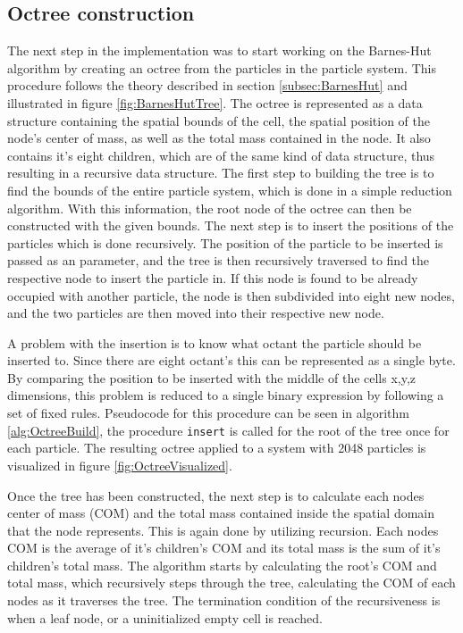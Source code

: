 \subsection{Octree construction} \label{subsec:OctreeConstruction}
The next step in the implementation was to start working on the Barnes-Hut algorithm by creating an octree from the particles in the particle system. This procedure follows the theory described in section \ref{subsec:BarnesHut} and illustrated in figure \ref{fig:BarnesHutTree}. The octree is represented as a data structure containing the spatial bounds of the cell, the spatial position of the node's center of mass, as well as the total mass contained in the node. It also contains it's eight children, which are of the same kind of data structure, thus resulting in a recursive data structure. The first step to building the tree is to find the bounds of the entire particle system, which is done in a simple reduction algorithm. With this information, the root node of the octree can then be constructed with the given bounds. The next step is to insert the positions of the particles which is done recursively. The position of the particle to be inserted is passed as an parameter, and the tree is then recursively traversed to find the respective node to insert the particle in. If this node is found to be already occupied with another particle, the node is then subdivided into eight new nodes, and the two particles are then moved into their respective new node. 

A problem with the insertion is to know what octant the particle should be inserted to. Since there are eight octant's this can be represented as a single byte. By comparing the position to be inserted with the middle of the cells x,y,z dimensions, this problem is reduced to a single binary expression by following a set of fixed rules. Pseudocode for this procedure can be seen in algorithm \ref{alg:OctreeBuild}, the procedure \lstinline{insert} is called for the root of the tree once for each particle. The resulting octree applied to a system with 2048 particles is visualized in figure \ref{fig:OctreeVisualized}.

Once the tree has been constructed, the next step is to calculate each nodes center of mass (COM) and the total mass contained inside the spatial domain that the node represents. This is again done by utilizing recursion. Each nodes COM is the average of it's children's COM and its total mass is the sum of it's children's total mass. The algorithm starts by calculating the root's COM and total mass, which recursively steps through the tree, calculating the COM of each nodes as it traverses the tree. The termination condition of the recursiveness is when a leaf node, or a uninitialized empty cell is reached.

